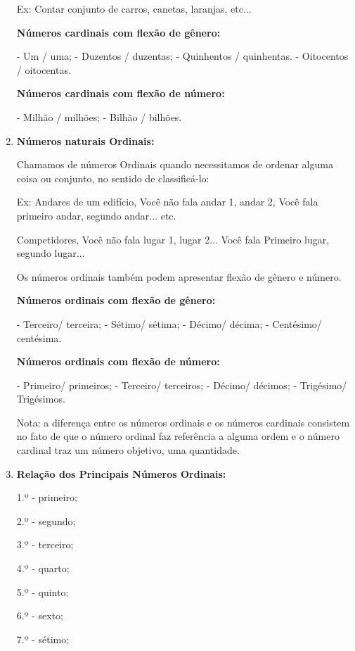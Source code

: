 \begin{multicols*}{2}
\begin{enumerate}
		      Ex:  Contar conjunto de carros, canetas, laranjas, etc$\dots$

		      \textbf{Números cardinais com flexão de gênero:}

		      - Um / uma;
		      - Duzentos / duzentas;
		      - Quinhentos / quinhentas.
		      - Oitocentos / oitocentas.

		      \textbf{Números cardinais com flexão de número:}

		      - Milhão / milhões;
		      - Bilhão / bilhões.

		\item \textbf{Números naturais Ordinais:}

		      Chamamos de números Ordinais quando necessitamos de ordenar alguma coisa ou conjunto, no sentido de classificá-lo:

		      Ex: 	Andares de um edifício, Você não fala andar 1, andar 2, Você fala primeiro andar, segundo andar$\dots$ etc.

		      Competidores, Você não fala lugar 1, lugar 2$\dots$ Você fala Primeiro lugar, segundo lugar$\dots$

		      Os números ordinais também podem apresentar flexão de gênero e número.

		      \textbf{Números ordinais com flexão de gênero:}

		      - Terceiro/ terceira;
		      - Sétimo/ sétima;
		      - Décimo/ décima;
		      - Centésimo/ centésima.

		      \textbf{Números ordinais com flexão de número:}

		      - Primeiro/ primeiros;
		      - Terceiro/ terceiros;
		      - Décimo/ décimos;
		      - Trigésimo/ Trigésimos.

		      Nota: a diferença entre os números ordinais e os números cardinais consistem no fato de que o número ordinal faz referência a alguma ordem e o número cardinal traz um número objetivo, uma quantidade.

		\item \textbf{Relação dos Principais Números Ordinais:}

		      1.º - primeiro;

		      2.º - segundo;

		      3.º - terceiro;

		      4.º - quarto;

		      5.º - quinto;

		      6.º - sexto;

		      7.º - sétimo;


\end{enumerate}
\end{multicols*}
